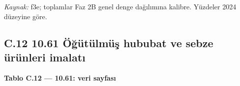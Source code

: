 \endgroup

\emph{Kaynak:} \etiketT{} f3e; toplamlar Faz 2B genel denge dağılımına kalibre. Yüzdeler 2024 düzeyine göre.

\hypertarget{nace_kartlar_10-12-c12-1061-uxf6ux11fuxfctuxfclmuxfcux15f-hububat-ve-sebze-uxfcruxfcnleri-imalatux131}{%
\subsection{C.12 10.61 Öğütülmüş hububat ve sebze ürünleri imalatı}\label{nace_kartlar_10-12-c12-1061-uxf6ux11fuxfctuxfclmuxfcux15f-hububat-ve-sebze-uxfcruxfcnleri-imalatux131}}


\textbf{Tablo C.12 --- 10.61: veri sayfası}

\nopagebreak[4]

\begingroup\gbtablo\small

